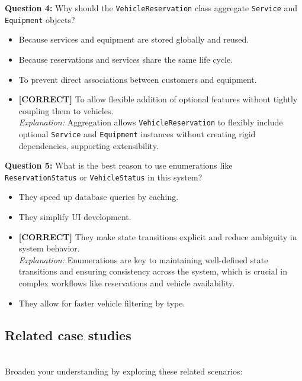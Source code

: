 \vspace{0.3cm}
\noindent
\textbf{Question 4:} Why should the \texttt{VehicleReservation} class aggregate \texttt{Service} and \texttt{Equipment} objects?
\\[0.2cm]
\begin{itemize}
 \item Because services and equipment are stored globally and reused.
 \item Because reservations and services share the same life cycle.
 \item To prevent direct associations between customers and equipment.
 \item \textbf{[CORRECT]} To allow flexible addition of optional features without tightly coupling them to vehicles.
\\[0.1cm]
\textit{Explanation:} 
Aggregation allows \texttt{VehicleReservation} to flexibly include optional \texttt{Service} and \texttt{Equipment} instances without creating rigid dependencies, supporting extensibility.
\end{itemize}
\vspace{0.3cm}
\noindent
\textbf{Question 5:} What is the best reason to use enumerations like \texttt{ReservationStatus} or \texttt{VehicleStatus} in this system?
\\[0.2cm]
\begin{itemize}
 \item They speed up database queries by caching.
 \item They simplify UI development.
 \item \textbf{[CORRECT]} They make state transitions explicit and reduce ambiguity in system behavior.
\\[0.1cm]
\textit{Explanation:} 
Enumerations are key to maintaining well-defined state transitions and ensuring consistency across the system, which is crucial in complex workflows like reservations and vehicle availability.
 \item They allow for faster vehicle filtering by type.
\end{itemize}

\subsection{Related case studies}\label{uFNHcYraWyXdwNPI2KWHr}
\\
Broaden your understanding by exploring these related scenarios:

